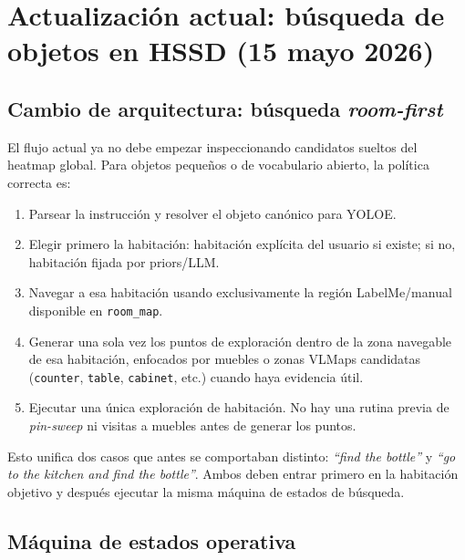 \documentclass[11pt,a4paper]{article}
\begin{document}
\section{Actualización actual: búsqueda de objetos en HSSD (15 mayo 2026)}

\subsection{Cambio de arquitectura: búsqueda \textit{room-first}}

El flujo actual ya no debe empezar inspeccionando candidatos sueltos del heatmap global.
Para objetos pequeños o de vocabulario abierto, la política correcta es:

\begin{enumerate}
  \item Parsear la instrucción y resolver el objeto canónico para YOLOE.
  \item Elegir primero la habitación: habitación explícita del usuario si existe;
        si no, habitación fijada por priors/LLM.
  \item Navegar a esa habitación usando exclusivamente la región LabelMe/manual
        disponible en \texttt{room\_map}.
  \item Generar una sola vez los puntos de exploración dentro de la zona navegable
        de esa habitación, enfocados por muebles o zonas VLMaps candidatas
        (\texttt{counter}, \texttt{table}, \texttt{cabinet}, etc.) cuando haya
        evidencia útil.
  \item Ejecutar una única exploración de habitación. No hay una rutina previa de
        \textit{pin-sweep} ni visitas a muebles antes de generar los puntos.
\end{enumerate}

Esto unifica dos casos que antes se comportaban distinto:
\textit{``find the bottle''} y \textit{``go to the kitchen and find the bottle''}.
Ambos deben entrar primero en la habitación objetivo y después ejecutar la misma
máquina de estados de búsqueda.

\subsection{Máquina de estados operativa}
\end{document}
